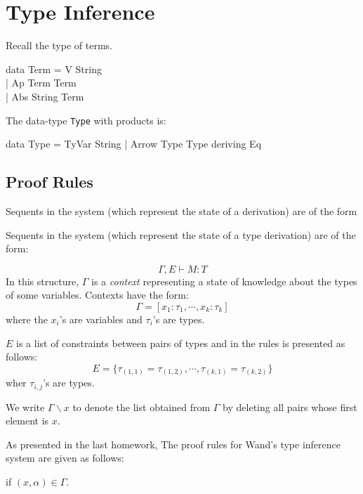 \documentclass[11pt]{article}
\begin{document}

\section{Type Inference}

Recall the type of terms.

\begin{program*}
\>  data Term = V String \\
\>            | Ap Term Term \\
\>            | Abs String Term \\
\end{program*}

\noindent{}The data-type {\tt{Type}} with products is:

\begin{program*}
\>   data Type = TyVar String | Arrow Type Type deriving Eq \\
\end{program*}

\subsection{Proof Rules}

Sequents in the system (which represent the state of a derivation) are of the form

Sequents in the system (which represent the state of a type derivation) are of
the form:

\[\Gamma,E \vdash M : T\]
In this structure, $\Gamma$ is a {\em{context}} representing a state of
knowledge about the types of some variables.  Contexts have the form:
 \[\Gamma = [x_1:\tau_1,\cdots{},x_k:\tau_k]\]
where the $x_i$'s are variables and $\tau_i$'s are types.

$E$ is a list of constraints between pairs
of types and in the rules is presented as follows:
\[E=\{\tau_{(1,1)} = \tau_{(1,2)}, \cdots , \tau_{(k,1)} = \tau_{(k,2)}\}\]
wher $\tau_{i,j}$'s are types.  

We write $\Gamma\backslash{}x$ to denote the list obtained from $\Gamma$ by
deleting all pairs whose first element is $x$.

As presented in the last homework, The proof rules for Wand's type
inference system are given as follows:


 {\hspace{.25in}} if $(x,\alpha)\in\Gamma$.
\vspace{.125in}\\
\end{document}
